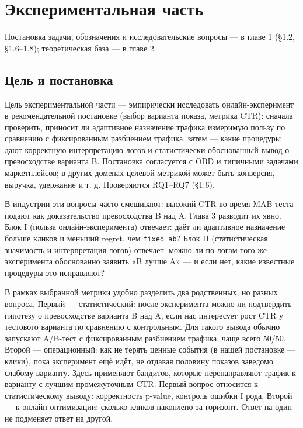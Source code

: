 \section{Экспериментальная часть}

Постановка задачи, обозначения и исследовательские вопросы --- в главе 1 (§1.2, §1.6--1.8); теоретическая база --- в главе 2.

\subsection{Цель и постановка}\label{ux446ux435ux43bux44c-ux438-ux43fux43eux441ux442ux430ux43dux43eux432ux43aux430}

Цель экспериментальной части --- эмпирически исследовать онлайн-эксперимент в рекомендательной постановке (выбор варианта показа, метрика CTR): сначала проверить, приносит ли адаптивное назначение трафика измеримую пользу по сравнению с фиксированным разбиением трафика, затем --- какие процедуры дают корректную интерпретацию логов и статистически обоснованный вывод о превосходстве варианта B. Постановка согласуется с OBD \cite{ref26} и типичными задачами маркетплейсов; в других доменах целевой метрикой может быть конверсия, выручка, удержание и т. д. Проверяются RQ1--RQ7 (§1.6).

В индустрии эти вопросы часто смешивают: высокий CTR во время MAB-теста подают как доказательство превосходства B над A. Глава 3 разводит их явно. Блок I (польза онлайн-эксперимента) отвечает: даёт ли адаптивное назначение больше кликов и меньший regret, чем \texttt{fixed\_ab}? Блок II (статистическая значимость и интерпретация логов) отвечает: можно ли по логам того же эксперимента обоснованно заявить «B лучше A» --- и если нет, какие известные процедуры это исправляют?

В рамках выбранной метрики удобно разделить два родственных, но разных вопроса. Первый --- статистический: после эксперимента можно ли подтвердить гипотезу о превосходстве варианта B над A, если нас интересует рост CTR у тестового варианта по сравнению с контрольным. Для такого вывода обычно запускают A/B-тест с фиксированным разбиением трафика, чаще всего 50/50. Второй --- операционный: как не терять ценные события (в нашей постановке --- клики), пока эксперимент ещё идёт, не отдавая половину показов заведомо слабому варианту. Здесь применяют бандитов, которые перенаправляют трафик к варианту с лучшим промежуточным CTR. Первый вопрос относится к статистическому выводу: корректность p-value, контроль ошибки I рода. Второй --- к онлайн-оптимизации: сколько кликов накоплено за горизонт. Ответ на один не подменяет ответ на другой.

